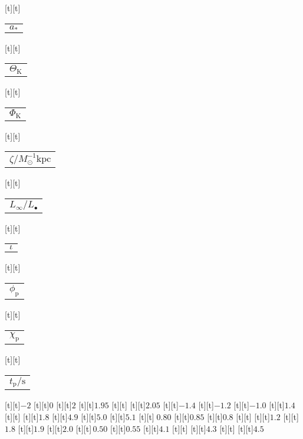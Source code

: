 \begin{psfrags}
[t][t]{\color[rgb]{0,0,0}\setlength{\tabcolsep}{0pt}\begin{tabular}{c}{$a_\ast$}\end{tabular}}%
[t][t]{\color[rgb]{0,0,0}\setlength{\tabcolsep}{0pt}\begin{tabular}{c}{$\Theta_\mathrm{K}$}\end{tabular}}%
[t][t]{\color[rgb]{0,0,0}\setlength{\tabcolsep}{0pt}\begin{tabular}{c}{$\Phi_\mathrm{K}$}\end{tabular}}%
[t][t]{\color[rgb]{0,0,0}\setlength{\tabcolsep}{0pt}\begin{tabular}{c}{$\zeta/M_\odot^{-1} \mathrm{kpc}$}\end{tabular}}%
[t][t]{\color[rgb]{0,0,0}\setlength{\tabcolsep}{0pt}\begin{tabular}{c}{$L_\infty/L_\bullet$}\end{tabular}}%
[t][t]{\color[rgb]{0,0,0}\setlength{\tabcolsep}{0pt}\begin{tabular}{c}{$\iota$}\end{tabular}}%
[t][t]{\color[rgb]{0,0,0}\setlength{\tabcolsep}{0pt}\begin{tabular}{c}{$\phi_\mathrm{p}$}\end{tabular}}%
[t][t]{\color[rgb]{0,0,0}\setlength{\tabcolsep}{0pt}\begin{tabular}{c}{$\chi_\mathrm{p}$}\end{tabular}}%
[t][t]{\color[rgb]{0,0,0}\setlength{\tabcolsep}{0pt}\begin{tabular}{c}{$t_\mathrm{p}/\mathrm{s}$}\end{tabular}}%
%
[t][t]{$-2$}%
[t][t]{$0$}%
[t][t]{$2$}%
[t][t]{$1.95$}%
[t][t]{}%
[t][t]{$2.05$}%
[t][t]{$-1.4$}%
[t][t]{$-1.2$}%
[t][t]{$-1.0$}%
[t][t]{$1.4$}%
[t][t]{}%
[t][t]{$1.8$}%
[t][t]{$4.9$}%
[t][t]{$5.0$}%
[t][t]{$5.1$}%
[t][t]{$\;0.80$}%
[t][t]{$0.85$}%
[t][t]{$0.8$}%
[t][t]{}%
[t][t]{$1.2$}%
[t][t]{$1.8$}%
[t][t]{$1.9$}%
[t][t]{$2.0$}%
[t][t]{$\,0.50$}%
[t][t]{$0.55$}%
[t][t]{$4.1$}%
[t][t]{}%
[t][t]{$4.3$}%
[t][t]{}%
[t][t]{$4.5$}%

\end{psfrags}
